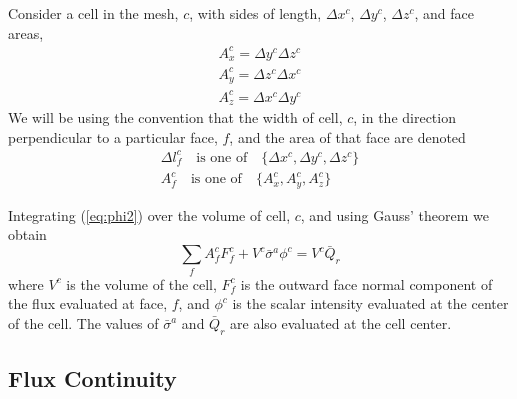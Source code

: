 \documentclass{article}
\begin{document}
Consider a cell in the mesh, $c$, with sides of length, $\Delta x^{c}$,
$\Delta y^{c}$, $\Delta z^{c}$, and face areas,
\begin{gather}
        A^{c}_{x} = \Delta y^{c} \Delta z^{c} \\
        A^{c}_{y} = \Delta z^{c} \Delta x^{c} \\
        A^{c}_{z} = \Delta x^{c} \Delta y^{c}
\end{gather}
We will be using the convention that the width of cell, $c$, in the direction
perpendicular to a particular face, $f$, and the area of that face are
denoted
\begin{gather}
        \Delta l^{c}_{f} \quad \text{is one of} \quad \{ \Delta x^{c}, 
                                \Delta y^{c}, \Delta z^{c} \} \\
        A^{c}_{f} \quad \text{is one of} \quad \{ A^{c}_{x},
                                 A^{c}_{y}, A^{c}_{z} \}
\end{gather}

Integrating (\ref{eq:phi2}) over the volume of cell, $c$,
and using Gauss' theorem we obtain
\begin{equation}
        \sum_{f} A^{c}_{f} F^{c}_{f} + V^{c} \bar{\sigma}^{a} \phi^{c}
                = V^{c} \bar{Q}_{r}
\label{eq:Balance}
\end{equation}
where $V^{c}$ is the volume of the cell, $F^{c}_{f}$ is the outward face normal
component of the flux evaluated at face, $f$, and $\phi^{c}$ is the
scalar intensity evaluated at the center of the cell.
The values of
$\bar{\sigma}^{a}$ and $\bar{Q}_{r}$ are also evaluated at the cell center.

\subsection{Flux Continuity}
\end{document}
